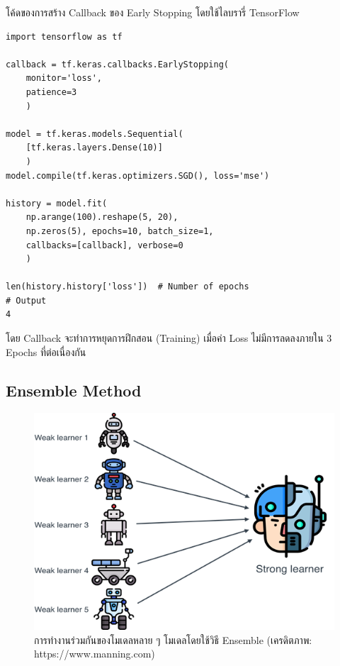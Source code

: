 \vspace{1em}
\noindent โค้ดของการสร้าง Callback ของ Early Stopping โดยใช้ไลบรารี่ TensorFlow 

\begin{lstlisting}[style=MyPython]
import tensorflow as tf

callback = tf.keras.callbacks.EarlyStopping(
    monitor='loss', 
    patience=3
    )

model = tf.keras.models.Sequential(
    [tf.keras.layers.Dense(10)]
    )
model.compile(tf.keras.optimizers.SGD(), loss='mse')

history = model.fit(
    np.arange(100).reshape(5, 20), 
    np.zeros(5), epochs=10, batch_size=1, 
    callbacks=[callback], verbose=0
    )

len(history.history['loss'])  # Number of epochs
# Output
4
\end{lstlisting}

\noindent โดย Callback จะทำการหยุดการฝึกสอน (Training) เมื่อค่า Loss ไม่มีการลดลงภายใน 3 Epochs ที่ต่อเนื่องกัน

\subsection{Ensemble Method}
\label{ssec:ensemble_model}

\begin{figure}[H]
    \centering
    \includegraphics[width=0.9\linewidth]{fig/ensemble_method.png}
    \caption{การทำงานร่วมกันของโมเดลหลาย ๆ โมเดลโดยใช้วิธี Ensemble (เครดิตภาพ: https://www.manning.com)}
    \label{fig:ensemble_method}
\end{figure}

